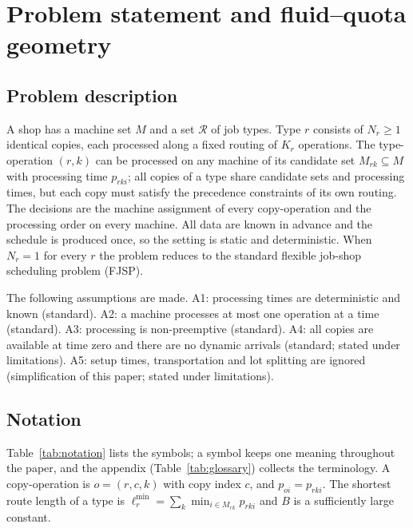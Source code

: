 \section{Problem statement and fluid--quota geometry}\label{sec:problem}

\subsection{Problem description}\label{sec:problem-desc}
A shop has a machine set $M$ and a set $\mathcal{R}$ of job types. Type $r$ consists of $N_r \ge 1$ identical copies,
each processed along a fixed routing of $K_r$ operations. The type-operation $(r,k)$ can be processed on any machine of
its candidate set $M_{rk} \subseteq M$ with processing time $p_{rki}$; all copies of a type share candidate sets and
processing times, but each copy must satisfy the precedence constraints of its own routing. The decisions are the machine
assignment of every copy-operation and the processing order on every machine. All data are known in advance and the
schedule is produced once, so the setting is static and deterministic. When $N_r = 1$ for every $r$ the problem reduces to
the standard flexible job-shop scheduling problem (FJSP).

The following assumptions are made. A1: processing times are deterministic and known (standard). A2: a machine processes
at most one operation at a time (standard). A3: processing is non-preemptive (standard). A4: all copies are available at
time zero and there are no dynamic arrivals (standard; stated under limitations). A5: setup times, transportation and lot
splitting are ignored (simplification of this paper; stated under limitations).

\subsection{Notation}\label{sec:notation}
Table~\ref{tab:notation} lists the symbols; a symbol keeps one meaning throughout the paper, and the appendix (Table~\ref{tab:glossary}) collects the terminology. A copy-operation is
$o = (r, c, k)$ with copy index $c$, and $p_{oi} = p_{rki}$. The shortest route length of a type is
$\ell_r^{\min} = \sum_k \min_{i \in M_{rk}} p_{rki}$ and $B$ is a sufficiently large constant.

